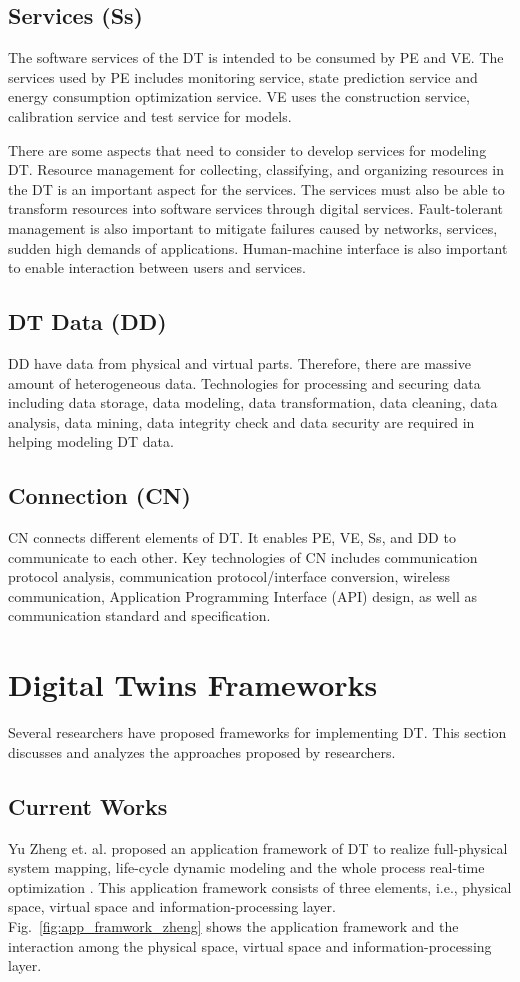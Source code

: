 \documentclass[article]{aaltoseries}
\begin{document}
\subsection{Services (Ss)}
The software services of the DT is intended to be consumed by PE and VE. The services used by PE includes monitoring service, state prediction service and energy consumption optimization service. VE uses the construction service, calibration service and test service for models.

There are some aspects that need to consider to develop services for modeling DT. Resource management for collecting, classifying, and organizing resources in the DT is an important aspect for the services. The services must also be able to transform resources into software services through digital services. Fault-tolerant management is also important to mitigate failures caused by networks, services, sudden high demands of applications. Human-machine interface is also important to enable interaction between users and services.

\subsection{DT Data (DD)}
DD have data from physical and virtual parts. Therefore, there are massive amount of heterogeneous data. Technologies for processing and securing data including data storage, data modeling, data transformation, data cleaning, data analysis, data mining, data integrity check and data security are required in helping modeling DT data.

\subsection{Connection (CN)}
CN connects different elements of DT. It enables PE, VE, Ss, and DD to communicate to each other. Key technologies of CN includes communication protocol analysis, communication protocol/interface conversion, wireless communication, Application Programming Interface (API) design, as well as communication standard and specification.

\section{Digital Twins Frameworks}
Several researchers have proposed frameworks for implementing DT. This section discusses and analyzes the approaches proposed by researchers.

\subsection{Current Works}
Yu Zheng et. al. proposed an application framework of DT to realize full-physical system mapping, life-cycle dynamic modeling and the whole process real-time optimization \cite{zheng2019application}. This application framework consists of three elements, i.e., physical space, virtual space and information-processing layer. Fig.~\ref{fig:app_framwork_zheng} shows the application framework and the interaction among the physical space, virtual space and information-processing layer.
\end{document}
